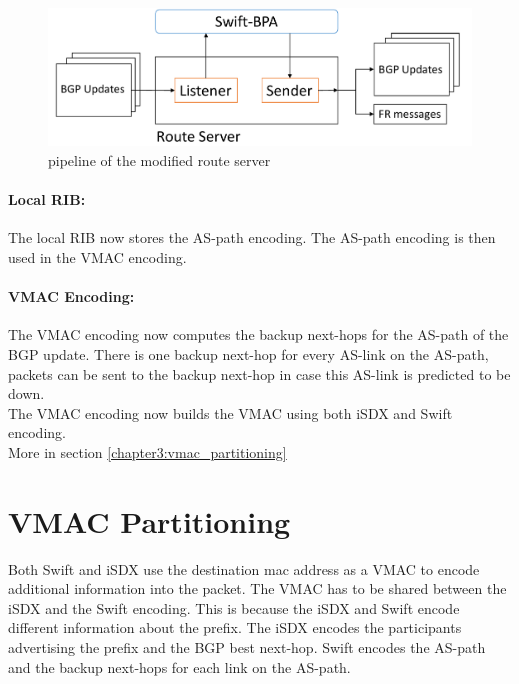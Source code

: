 \begin{figure}[h]
\center
\includegraphics[scale = 0.45]{Figures/design_route_server_cropped2.pdf}
\caption{pipeline of the modified route server}
\end{figure}


\paragraph{\label{chapter3:Changes to the iSDX:local RIB}Local RIB:}
The local RIB now stores the AS-path encoding. The AS-path encoding is then used in the VMAC encoding. 

\paragraph{\label{chapter3:Changes to the iSDX:Vmac Encoding}VMAC Encoding:}
The VMAC encoding now computes the backup next-hops for the AS-path of the BGP update. There is one backup next-hop for every AS-link on the AS-path, packets can be sent to the backup next-hop in case this AS-link is predicted to be down. \\
The VMAC encoding now builds the VMAC using both iSDX and Swift encoding. \\
 More in section \ref{chapter3:vmac_partitioning} 

\section{\label{chapter3:vmac_partitioning}VMAC Partitioning}

Both Swift and iSDX use the destination mac address as a VMAC to encode additional information into the packet.  The VMAC has to be shared between the iSDX and the Swift encoding. This is because the iSDX and Swift encode different information about the prefix. The iSDX encodes the participants advertising the prefix and the BGP best next-hop. Swift encodes the AS-path and the backup next-hops for each link on the AS-path.

